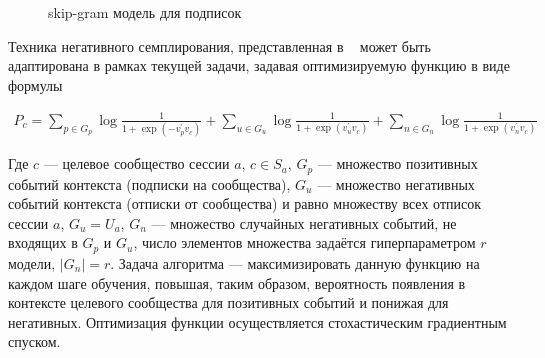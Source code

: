\documentclass[times,specification,annotation]{itmo-student-thesis}
\begin{document}
\begin{figure}[!h]
\caption{skip-gram модель для подписок}\label{fig2}
\centering
{}
\end{figure}

Техника негативного семплирования, представленная в ~\cite{airbnb} может быть адаптирована в рамках текущей задачи, задавая оптимизируемую функцию в виде формулы

\begin{align}
P_c = \sum_{p \in G_p} \log \frac{1}{1 + \exp(-v_p^{'}v_c)} + \sum_{u \in G_u} \log \frac{1}{1 + \exp(v_u^{'}v_c)} + \sum_{n \in G_n} \log \frac{1}{1 + \exp(v_n^{'}v_c)} \label{eq3}
\end{align}

Где $c$ --- целевое сообщество сессии $a$, $c \in S_a$, $G_p$ --- множество позитивных событий
контекста (подписки на сообщества), $G_u$ --- множество негативных событий
контекста (отписки от сообщества) и равно множеству всех отписок сессии $a$, $G_u = U_a$, $G_n$ --- множество случайных негативных событий, не входящих в $G_p$ и $G_u$, число элементов множества задаётся гиперпараметром $r$ модели, $|G_n| = r$. Задача алгоритма --- максимизировать данную
функцию на каждом шаге обучения, повышая, таким образом, вероятность появления в контексте целевого сообщества для позитивных событий и понижая для негативных. Оптимизация функции осуществляется стохастическим градиентным спуском. 
\end{document}
